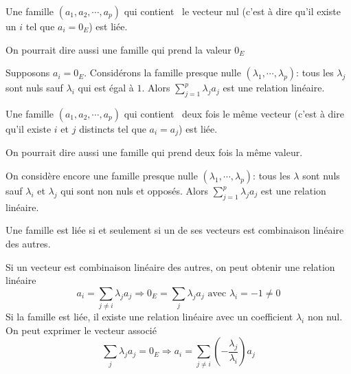 \begin{propn}
 Une famille $(a_1,a_2,\cdots,a_p)$ qui \og contient\fg~ le vecteur nul (c'est à dire qu'il existe un $i$ tel que $a_i=0_E$) est liée.
\end{propn}
On pourrait dire aussi une famille qui prend la valeur $0_E$
\begin{demo}
Supposons $a_i=0_E$. Considérons la famille presque nulle $(\lambda_1, \cdots,\lambda_p)$: tous les $\lambda_j$ sont nuls sauf $\lambda_i$ qui est égal à $1$. Alors $\sum_{j=1}^{p}\lambda_j a_j$ est une relation linéaire.
\end{demo}

\begin{propn}
 Une famille $(a_1,a_2,\cdots,a_p)$ qui \og contient\fg~ deux fois le même vecteur (c'est à dire qu'il existe $i$ et $j$ distincts tel que $a_i=a_j$) est liée.
\end{propn}
On pourrait dire aussi une famille qui prend deux fois la même valeur.
\begin{demo}
On considère encore une famille presque nulle $(\lambda_1, \cdots,\lambda_p)$: tous les $\lambda$ sont nuls sauf $\lambda_i$ et $\lambda_j$ qui sont non nuls et opposés. Alors $\sum_{j=1}^{p}\lambda_j a_j$ est une relation linéaire.
\end{demo}

\begin{propn}\label{cliee}
 Une famille est liée si et seulement si un de ses vecteurs est combinaison linéaire des autres.
\end{propn}
\begin{demo}
Si un vecteur est combinaison linéaire des autres, on peut obtenir une relation linéaire 
\begin{displaymath}
  a_i = \sum_{j\neq i} \lambda_j a_j \Rightarrow 0_E = \sum_{j} \lambda_j a_j \text{ avec } \lambda_i = -1 \neq 0
\end{displaymath}
Si la famille est liée, il existe une relation linéaire avec un coefficient $\lambda_i$ non nul. On peut exprimer le vecteur associé
\begin{displaymath}
  \sum_{j}\lambda_j a_j = 0_E \Rightarrow a_i = \sum_{j\neq i}\left(-\frac{\lambda_j}{\lambda_i} \right)a_j 
\end{displaymath}
\end{demo}

